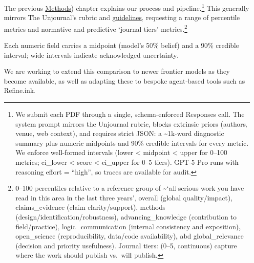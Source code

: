 \documentclass[
  11pt,
  letterpaper,
  DIV=11,
  numbers=noendperiod]{scrreprt}
\begin{document}
The previous \hyperref[data-and-methods]{Methods}) chapter explains our
process and pipeline.\footnote{We submit each PDF through a single,
  schema-enforced Responses call. The system prompt mirrors the
  Unjournal rubric, blocks extrinsic priors (authors, venue, web
  context), and requires strict JSON: a \textasciitilde1k-word
  diagnostic summary plus numeric midpoints and 90\% credible intervals
  for every metric. We enforce well-formed intervals (lower \textless{}
  midpoint \textless{} upper for 0--100 metrics; ci\_lower \textless{}
  score \textless{} ci\_upper for 0--5 tiers). GPT-5 Pro runs with
  reasoning effort = ``high'', so traces are available for audit.} This
generally mirrors The Unjournal's rubric and
\href{https://globalimpact.gitbook.io/the-unjournal-project-and-communication-space/policies-projects-evaluation-workflow/evaluation/guidelines-for-evaluators}{guidelines},
requesting a range of percentile metrics and normative and predictive
`journal tiers' metrics.\footnote{0--100 percentiles relative to a
  reference group of \textasciitilde{}`all serious work you have read in
  this area in the last three years', overall (global quality/impact),
  claims\_evidence (claim clarity/support), methods
  (design/identification/robustness), advancing\_knowledge (contribution
  to field/practice), logic\_communication (internal consistency and
  exposition), open\_science (reproducibility, data/code availability),
  abd global\_relevance (decision and priority usefulness). Journal
  tiers: (0--5, continuous) capture where the work should publish
  vs.~will publish.}

Each numeric field carries a midpoint (model's 50\% belief) and a 90\%
credible interval; wide intervals indicate acknowledged uncertainty.

\begin{tcolorbox}[enhanced jigsaw, colback=white, title=\textcolor{quarto-callout-note-color}{\faInfo}\hspace{0.5em}{Future Models}, bottomrule=.15mm, coltitle=black, left=2mm, colframe=quarto-callout-note-color-frame, toptitle=1mm, toprule=.15mm, titlerule=0mm, breakable, leftrule=.75mm, colbacktitle=quarto-callout-note-color!10!white, bottomtitle=1mm, arc=.35mm, rightrule=.15mm, opacityback=0, opacitybacktitle=0.6]

We are working to extend this comparison to newer frontier models as
they become available, as well as adapting these to bespoke agent-based
tools such as Refine.ink.

\end{tcolorbox}
\end{document}
